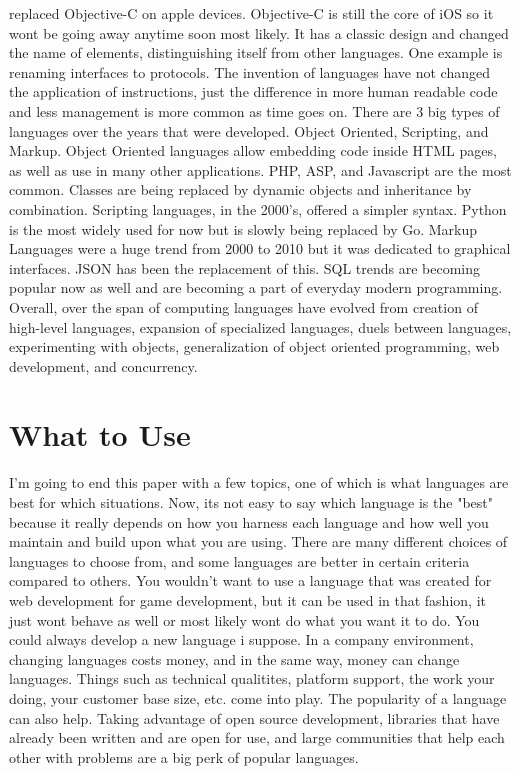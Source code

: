 \documentclass[letterpaper, 10 pt, conference]{IEEEtran}
\begin{document}
replaced Objective-C on apple devices. Objective-C is still the core of iOS so it wont be going away anytime soon most likely. It has a classic design and changed the name of elements, distinguishing itself from other languages. One example is renaming interfaces to protocols.
\indent The invention of languages have not changed the application of instructions, just the difference in more human readable code and less management is more common as time goes on. There are 3 big types of languages over the years that were developed. Object Oriented, Scripting, and Markup. Object Oriented languages allow embedding code inside HTML pages, as well as use in many other applications. PHP, ASP, and Javascript are the most common. Classes are being replaced by dynamic objects and inheritance by combination. Scripting languages, in the 2000's, offered a simpler syntax. Python is the most widely used for now but is slowly being replaced by Go. Markup Languages were a huge trend from 2000 to 2010 but it was dedicated to graphical interfaces. JSON has been the replacement of this. SQL trends are becoming popular now as well and are becoming a part of everyday modern programming.
\indent Overall, over the span of computing languages have evolved from creation of high-level languages, expansion of specialized languages, duels between languages, experimenting with objects, generalization of object oriented programming, web development, and concurrency. 


\section{What to Use}
\indent I'm going to end this paper with a few topics, one of which is what languages are best for which situations. Now, its not easy to say which language is the "best" because it really depends on how you harness each language and how well you maintain and build upon what you are using. There are many different choices of languages to choose from, and some languages are better in certain criteria compared to others. You wouldn't want to use a language that was created for web development for game development, but it can be used in that fashion, it just wont behave as well or most likely wont do what you want it to do. You could always develop a new language i suppose. In a company environment, changing languages costs money, and in the same way, money can change languages. Things such as technical qualitites, platform support, the work your doing, your customer base size, etc. come into play. The popularity of a language can also help. Taking advantage of open source development, libraries that have already been written and are open for use, and large communities that help each other with problems are a big perk of popular languages. 
\newline
\end{document}
